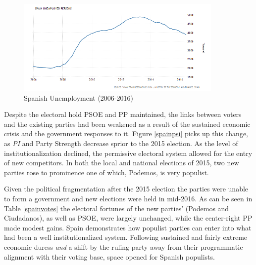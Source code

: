 \documentclass[a4paper,12pt]{article}\usepackage[]{graphicx}\usepackage[]{color}
\begin{document}
\par
\begin{figure}%
\centering
\parbox{4in}{\includegraphics[width=100mm]{spain_unem.png}}%
\caption{Spanish Unemployment (2006-2016)}%
\label{spain_unem}%
\end{figure}
Despite the electoral hold PSOE and PP maintained, the links between voters and the existing parties had been weakened as a result of the sustained economic crisis and the government responses to it. Figure \ref{spainpsi} picks up this change, as \textit{PI} and Party Strength decrease sprior to the 2015 election. As the level of institutionalization declined, the permissive electoral system allowed for the entry of new competitors. In both the local and national elections of 2015, two new parties rose to prominence one of which, Podemos, is very populist. 
\par
Given the political fragmentation after the 2015 election the parties were unable to form a government and new elections were held in mid-2016. As can be seen in Table \ref{spainvotes} the electoral fortunes of the new parties' (Podemos and Ciudadanos), as well as PSOE, were largely unchanged, while the center-right PP made modest gains. Spain demonstrates how populist parties can enter into what had been a well institutionalized system. Following sustained and fairly extreme economic duress \textit{and} a shift by the ruling party away from their programmatic alignment with their voting base, space opened for Spanish populists. 
\end{document}
